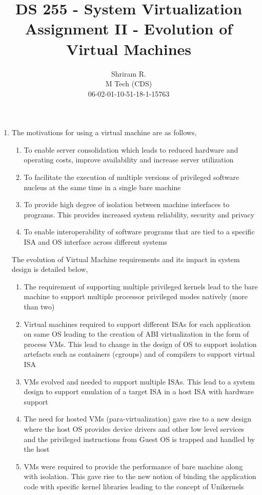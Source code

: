 \documentclass[11pt,a4paper,oneside]{article}
\begin{document}
	\title{DS 255 - System Virtualization \\ Assignment II - Evolution of Virtual Machines}
	\author{Shriram R. \\ M Tech (CDS) \\ 06-02-01-10-51-18-1-15763}
	\maketitle	
	
	\begin{enumerate}
		\item The motivations for using a virtual machine are as follows,
			  \begin{enumerate}
			  	\item To enable server consolidation which leads to reduced hardware and operating costs, improve availability and increase server utilization 
			  	\item To facilitate the execution of multiple versions of privileged software nucleus at the same time in a single bare machine
			  	\item To provide high degree of isolation between machine interfaces to programs. This provides increased system reliability, security and privacy
			  	\item To enable interoperability of software programs that are tied to a specific ISA and OS interface across different systems
			  \end{enumerate}
		      The evolution of Virtual Machine requirements and its impact in system design is detailed below,
		      \begin{enumerate}
		      	\item The requirement of supporting multiple privileged kernels lead to the bare machine to support multiple processor privileged modes natively (more than two) 
		      	\item Virtual machines required to support different ISAs for each application on same OS leading to the creation of ABI virtualization in the form of process VMs. This lead to change in the design of OS to support isolation artefacts such as containers (cgroups) and of compilers to support virtual ISA
		      	\item VMs evolved and needed to support multiple ISAs. This lead to a system design to support emulation of a target ISA in a host ISA with hardware support  
		      	\item The need for hosted VMs (para-virtualization) gave rise to a new design where the host OS provides device drivers and other low level services and the privileged instructions from Guest OS is trapped and handled by the host
		      	\item VMs were required to provide the performance of bare machine along with isolation. This gave rise to the new notion of binding the application code with specific kernel libraries leading to the concept of Unikernels
		      \end{enumerate}	
		      

\end{enumerate}
\end{document}
